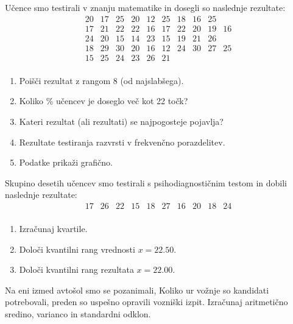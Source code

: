 \begin{Vaje}{1}
    Učence smo testirali v znanju matematike in dosegli so naslednje rezultate:
\[
\begin{array}{cccccccccccccc}
20 & 17 & 25 & 20 & 12 & 25 & 18 & 16 & 25 \\
17 & 21 & 22 & 22 & 16 & 17 & 22 & 20 & 19 & 16 \\
24 & 20 & 15 & 14 & 23 & 15 & 19 & 21 & 26 \\
18 & 29 & 30 & 20 & 16 & 12 & 24 & 30 & 27 & 25 \\
15 & 25 & 24 & 23 & 26 & 21 \\
\end{array}
\]

\begin{enumerate}
\item Poišči rezultat z rangom 8 (od najslabšega).
\item Koliko \% učencev je doseglo več kot 22 točk?
\item Kateri rezultat (ali rezultati) se najpogosteje pojavlja?
\item Rezultate testiranja razvrsti v frekvenčno porazdelitev.
\item Podatke prikaži grafično.
\end{enumerate}
\end{Vaje}

\begin{Vaje}{2} 
        Skupino desetih učencev smo testirali s psihodiagnostičnim testom in dobili naslednje rezultate:
        \[
        \begin{array}{cccccccccc}
        17 & 26 & 22 & 15 & 18 & 27 & 16 & 20 & 18 & 24 \\
        \end{array}
        \]
        
        \begin{enumerate}
            \item Izračunaj kvartile.
            \item Določi kvantilni rang vrednosti $x = 22.50$.
            \item Določi kvantilni rang rezultata $x = 22.00$.
        \end{enumerate}
\end{Vaje}

\begin{Vaje}{3}
    Na eni izmed avtošol smo se pozanimali, Koliko ur vožnje so kandidati potrebovali, preden so uspešno opravili vozniški izpit. Izračunaj aritmetično sredino, varianco in standardni odklon.
\end{Vaje}